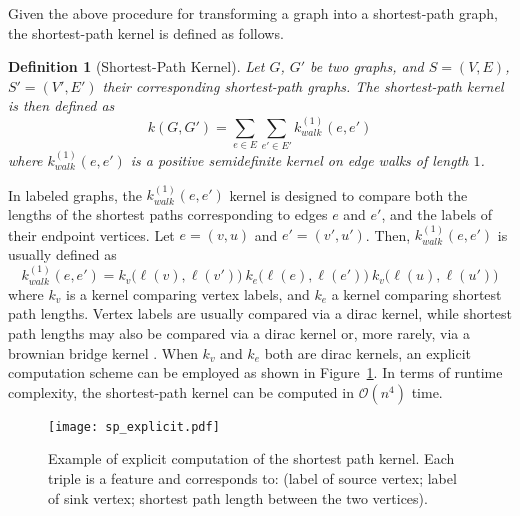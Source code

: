 \documentclass[twoside,11pt]{article}
\newtheorem{definition}{Definition}
\begin{document}
Given the above procedure for transforming a graph into a shortest-path graph, the shortest-path kernel is defined as follows.
\begin{definition}[Shortest-Path Kernel]
  Let $G$, $G'$ be two graphs, and $S=(V,E)$, $S'=(V',E')$ their corresponding shortest-path graphs.
  The shortest-path kernel is then defined as
  \begin{equation}
    k(G,G') = \sum_{e \in E} \sum_{e' \in E'} k_{walk}^{(1)}(e, e')
  \end{equation}
  where $k_{walk}^{(1)}(e, e')$ is a positive semidefinite kernel on edge walks of length $1$.
\end{definition}
In labeled graphs, the $k_{walk}^{(1)}(e, e')$ kernel is designed to compare both the lengths of the shortest paths corresponding to edges $e$ and $e'$, and the labels of their endpoint vertices.
Let $e = (v, u)$ and $e' = (v', u')$.
Then, $k_{walk}^{(1)}(e, e')$ is usually defined as
\begin{equation}
  k_{walk}^{(1)}(e, e') = k_v \big(\ell(v),\ell(v') \big) \ k_e \big(\ell(e),\ell(e') \big) \ k_v \big(\ell(u),\ell(u') \big)
\end{equation}
where $k_v$ is a kernel comparing vertex labels, and $k_e$ a kernel comparing shortest path lengths.
Vertex labels are usually compared via a dirac kernel, while shortest path lengths may also be compared via a dirac kernel or, more rarely, via a brownian bridge kernel .
When $k_v$ and $k_e$ both are dirac kernels, an explicit computation scheme can be employed as shown in Figure~\ref{fig:shortest_path}.
In terms of runtime complexity, the shortest-path kernel can be computed in $\mathcal{O}(n^4)$ time.

\begin{figure}[t]
    \centering
    \texttt{[image: sp\_explicit.pdf]}
    \caption{Example of explicit computation of the shortest path kernel. Each triple is a feature and corresponds to: (label of source vertex; label of sink vertex; shortest path length between the two vertices).}
    \label{fig:shortest_path}
\end{figure}
\end{document}
